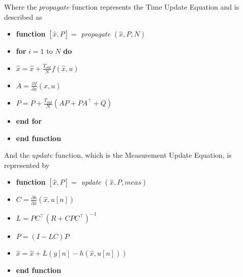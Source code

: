 Where the $propagate$ function represents the Time Update Equation and is described as
\begin{itemize}
\item \textbf{function} $[\hat{x},P]=$ \textit{propagate} $(\hat{x},P,N)$
\item \quad \textbf{for} $i=1$ to $N$ \textbf{do}
\item \qquad $\hat{x}=\hat{x}+\frac{T_{out}}{N}f(\hat{x},u)$
\item \qquad $A=\frac{\partial f}{\partial x}(\hat{x},u)$
\item \qquad $P=P+\frac{T_{out}}{N}(AP+PA^\top+Q)$
\item \quad \textbf{end for}
\item \textbf{end function}
\end{itemize}
And the $update$ function, which is the Measurement Update Equation, is represented by
\begin{itemize}
\item \textbf{function} $[\hat{x},P]=$ \textit{update} $(\hat{x},P,meas)$
\item \quad $C = \frac{\partial h}{\partial x}(\hat{x},u[n])$
\item \quad $L = PC^\top(R+CPC^\top)^{-1}$
\item \quad $P = (I-LC)P$
\item \quad $\hat{x} = \hat{x}+L(y[n]-h(\hat{x},u[n]))$
\item \textbf{end function}
\end{itemize}





